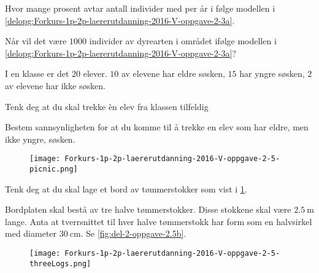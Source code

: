 \begin{oppgaver}
   Hvor mange prosent avtar antall individer med per år i følge
    modellen i \cref{delopg:Forkurs-1p-2p-laererutdanning-2016-V-oppgave-2-3a}.
\end{oppgaver}

\begin{oppgaver}
   Når vil det være $\num{1000}$ individer av dyrearten i området
    ifølge modellen i
    \cref{delopg:Forkurs-1p-2p-laererutdanning-2016-V-oppgave-2-3a}?
\end{oppgaver}


\Oppgave[2] 

I en klasse er det $20$ elever. $10$ av elevene har eldre søsken, $15$ har yngre
søsken, $2$ av elevene har ikke søsken. \bigskip

Tenk deg at du skal trekke èn elev fra klassen tilfeldig \bigskip

Bestem sannsynligheten for at du komme til å trekke en elev som har eldre, men
ikke yngre, søsken.


\Oppgave[3] 

\begin{figure}[H]
  \centering
  \texttt{[image: Forkurs-1p-2p-laererutdanning-2016-V-oppgave-2-5-picnic.png]}
  \caption{}
  \label{fig:Forkurs-1p-2p-laererutdanning-2016-V-oppgave-2-5a}
\end{figure}

Tenk deg at du skal lage et bord av tømmerstokker som vist i
\cref{fig:Forkurs-1p-2p-laererutdanning-2016-V-oppgave-2-5a}. \bigskip

Bordplaten skal bestå av tre halve tømmerstokker. Disse stokkene skal være
$\SI{2.5}{\m}$ lange. Anta at tverrsnittet til hver halve tømmerstokk har form
som en halvsirkel med diameter $\SI{30}{\cm}$. Se \cref{fig:del-2-oppgave-2.5b}.

\begin{figure}[H]
  \centering
  \texttt{[image: Forkurs-1p-2p-laererutdanning-2016-V-oppgave-2-5-threeLogs.png]}
  \caption{}
  \label{fig:Forkurs-1p-2p-laererutdanning-2016-V-oppgave-2-5b}
\end{figure}

